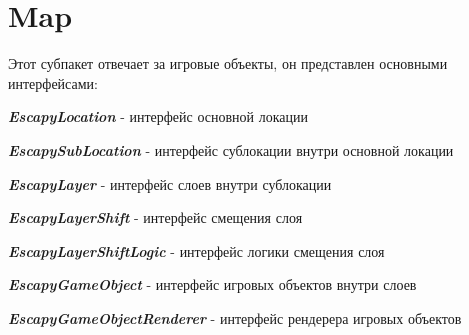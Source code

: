 \documentclass[11pt]{report}
\newenvironment{itemize*}%
  {\begin{itemize}%
    \setlength{\itemsep}{2pt}%
    \setlength{\parskip}{0.75pt}}%
  {\end{itemize}}
\begin{document}
\section{Map}
Этот субпакет отвечает за игровые объекты, он представлен основными интерфейсами:
\begin{itemize*} 
	\item \textit{\textbf{EscapyLocation}} - интерфейс основной локации
	\item \textit{\textbf{EscapySubLocation}} - интерфейс сублокации внутри основной 			локации
	\item \textit{\textbf{EscapyLayer}} - интерфейс слоев внутри сублокации
	\item \textit{\textbf{EscapyLayerShift}} - интерфейс смещения слоя
	\item \textit{\textbf{EscapyLayerShiftLogic}} - интерфейс логики смещения слоя
	\item \textit{\textbf{EscapyGameObject}} - интерфейс игровых объектов внутри слоев
	\item \textit{\textbf{EscapyGameObjectRenderer}} - интерфейс рендерера игровых 				объектов
	\\
\end{itemize*}
\end{document}
